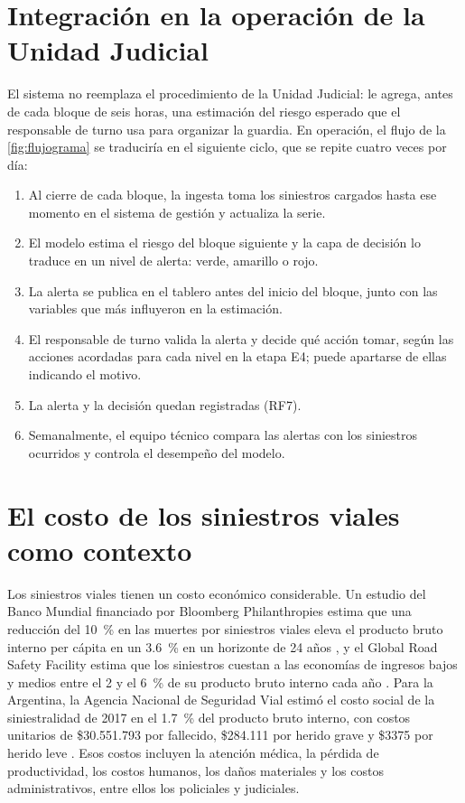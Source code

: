 \section{Integración en la operación de la Unidad Judicial}\label{sec:impl-operacion}

El sistema no reemplaza el procedimiento de la Unidad Judicial: le agrega, antes de cada
bloque de seis horas, una estimación del riesgo esperado que el responsable de turno usa
para organizar la guardia. En operación, el flujo de la \cref{fig:flujograma} se
traduciría en el siguiente ciclo, que se repite cuatro veces por día:

\begin{enumerate}[leftmargin=*,itemsep=2pt]
  \item Al cierre de cada bloque, la ingesta toma los siniestros cargados hasta ese
        momento en el sistema de gestión y actualiza la serie.
  \item El modelo estima el riesgo del bloque siguiente y la capa de decisión lo traduce
        en un nivel de alerta: verde, amarillo o rojo.
  \item La alerta se publica en el tablero antes del inicio del bloque, junto con las
        variables que más influyeron en la estimación.
  \item El responsable de turno valida la alerta y decide qué acción tomar, según las
        acciones acordadas para cada nivel en la etapa E4; puede apartarse de ellas
        indicando el motivo.
  \item La alerta y la decisión quedan registradas (RF7).
  \item Semanalmente, el equipo técnico compara las alertas con los siniestros ocurridos
        y controla el desempeño del modelo.
\end{enumerate}

\section{El costo de los siniestros viales como contexto}\label{sec:impl-contexto}

Los siniestros viales tienen un costo económico considerable. Un estudio del Banco
Mundial financiado por Bloomberg Philanthropies estima que una reducción del
\qty{10}{\percent} en las muertes por siniestros viales eleva el producto bruto interno per
cápita en un \qty{3.6}{\percent} en un horizonte de 24 años
\parencite{bloomberg2018,worldbank2017}, y el Global Road Safety Facility estima que los
siniestros cuestan a las economías de ingresos bajos y medios entre el 2 y el
\qty{6}{\percent} de su producto bruto interno cada año \parencite{grsf2025}. Para la
Argentina, la Agencia Nacional de Seguridad Vial estimó el costo social de la
siniestralidad de 2017 en el \qty{1.7}{\percent} del producto bruto interno, con costos
unitarios de \$30.551.793 por fallecido, \$284.111 por herido grave y \$3375 por herido
leve \parencite{ansv2019}. Esos costos incluyen la atención médica, la pérdida de
productividad, los costos humanos, los daños materiales y los costos administrativos,
entre ellos los policiales y judiciales.

